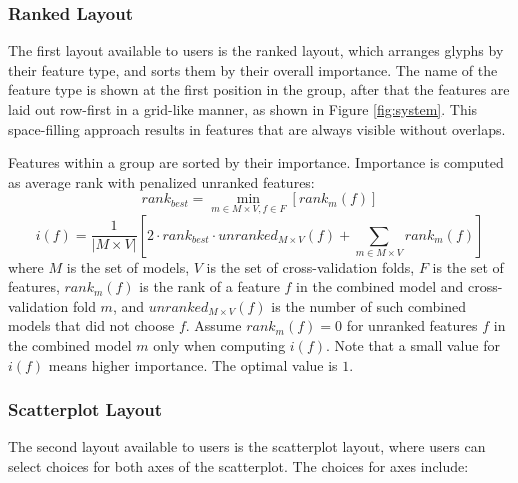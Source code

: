 


\vspace*{1em}
\subsubsection{Ranked Layout}\label{sec:rankedlayout}
The first layout available to users is the ranked layout, which arranges glyphs by their feature type, and sorts them by their overall importance.  The name of the feature type is shown at the first position in the group, after that the features are laid out row-first in a grid-like manner, as shown in Figure \ref{fig:system}. This space-filling approach results in features that are always visible without overlaps.

Features within a group are sorted by their importance. Importance is computed as average rank with
penalized unranked features:
\[
rank_{best} = \min_{m \in M \times V, f \in F}{[rank_{m}(f)]}
\]\[
i(f) = \dfrac{1}{| M \times V |}[
2 \cdot rank_{best} \cdot
unranked_{M \times V} (f)
+ \sum_{m \in M \times V} rank_{m}(f)
]
\]
where $M$ is the set of models, $V$ is the set of cross-validation folds,
$F$ is the set of features,
$rank_{m}(f)$ is the rank of a feature $f$ in the combined model
and cross-validation fold $m$,
and $unranked_{M \times V} (f)$ is the number
of such combined models that did not choose $f$.
Assume $rank_{m}(f) = 0$ for unranked features $f$
in the combined model $m$ only when computing $i(f)$.
Note that a small value for $i(f)$ means higher importance.
The optimal value is $1$.

\subsubsection{Scatterplot Layout}\label{sec:scatterplotlayout}
The second layout available to users is the scatterplot layout, where users can select choices for both axes of the scatterplot.  The choices for axes include:

